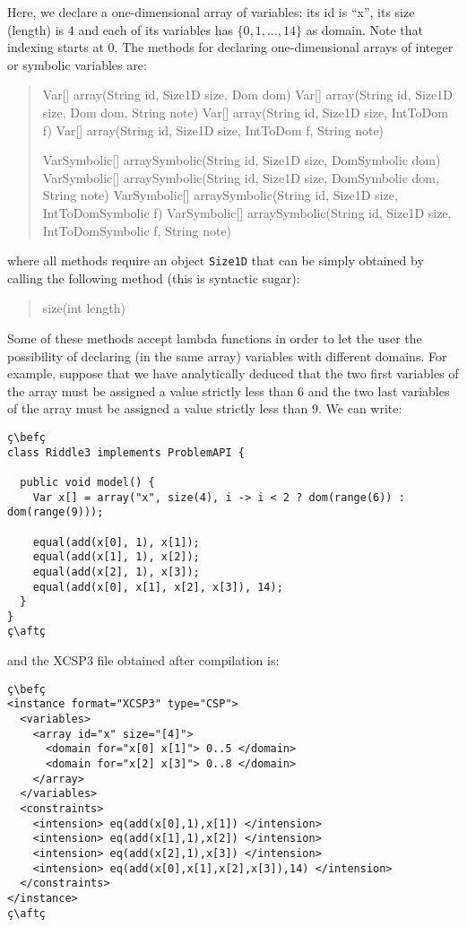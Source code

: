 \documentclass[10pt]{article}
\def\xt{{\rm XCSP3}\xspace}
\newcommand{\nn}[1]{{\tt #1}} %
\def\xt{{\rm XCSP3}\xspace}
\newenvironment{myvb}{\endgraf\small\verbatim}{\endverbatim}
\def\bef{\rule{10cm}{0.1mm}} %
\def\aft{\rule{10cm}{0.1mm}\medskip}
\begin{document}
Here, we declare a one-dimensional array of variables: its id is ``x'', its size (length) is 4 and each of its variables has $\{0,1,\dots,14\}$ as domain.
Note that indexing starts at 0.
The methods for declaring one-dimensional arrays of integer or symbolic variables are:

\begin{quote}
\begin{myvb}
Var[] array(String id, Size1D size, Dom dom) 
Var[] array(String id, Size1D size, Dom dom, String note) 
Var[] array(String id, Size1D size, IntToDom f) 
Var[] array(String id, Size1D size, IntToDom f, String note) 

VarSymbolic[] arraySymbolic(String id, Size1D size, DomSymbolic dom) 
VarSymbolic[] arraySymbolic(String id, Size1D size, DomSymbolic dom, String note)
VarSymbolic[] arraySymbolic(String id, Size1D size, IntToDomSymbolic f) 
VarSymbolic[] arraySymbolic(String id, Size1D size, IntToDomSymbolic f, String note)
\end{myvb}
\end{quote}

where all methods require an object \nn{Size1D} that can be simply obtained by calling the following method (this is syntactic sugar):
\begin{quote}
\begin{myvb}
size(int length)
\end{myvb}
\end{quote}

Some of these methods accept lambda functions in order to let the user the possibility of declaring (in the same array) variables with different domains.
For example, suppose that we have analytically deduced that the two first variables of the array must be assigned a value strictly less than 6 and the two last variables of the array must be assigned a value strictly less than 9.
We can write:

\begin{lstlisting}
ç\befç
class Riddle3 implements ProblemAPI {

  public void model() {
    Var x[] = array("x", size(4), i -> i < 2 ? dom(range(6)) : dom(range(9)));
    
    equal(add(x[0], 1), x[1]);
    equal(add(x[1], 1), x[2]);
    equal(add(x[2], 1), x[3]);
    equal(add(x[0], x[1], x[2], x[3]), 14);
  }
}
ç\aftç
\end{lstlisting}
and the \xt file obtained after compilation is:
\begin{lstlisting}
ç\befç
<instance format="XCSP3" type="CSP">
  <variables>
    <array id="x" size="[4]">
      <domain for="x[0] x[1]"> 0..5 </domain>
      <domain for="x[2] x[3]"> 0..8 </domain>
    </array>
  </variables>
  <constraints>
    <intension> eq(add(x[0],1),x[1]) </intension>
    <intension> eq(add(x[1],1),x[2]) </intension>
    <intension> eq(add(x[2],1),x[3]) </intension>
    <intension> eq(add(x[0],x[1],x[2],x[3]),14) </intension>
  </constraints>
</instance>
ç\aftç
\end{lstlisting}
\end{document}
